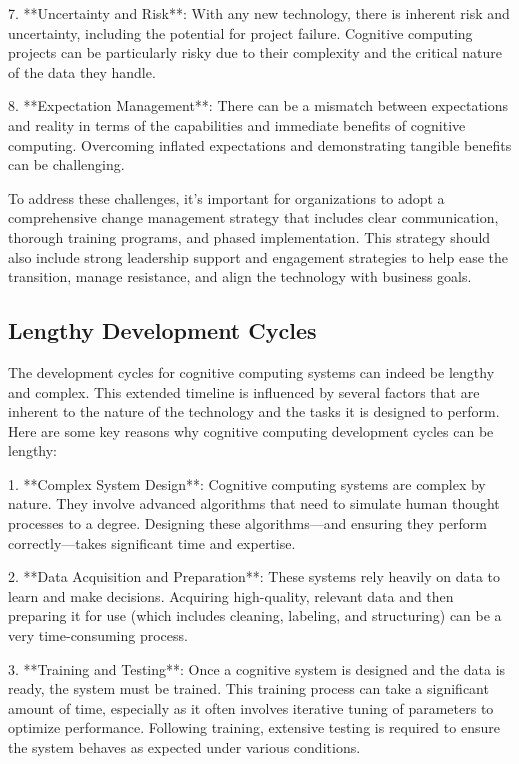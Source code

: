 \documentclass{article}
\begin{document}
\begin{enumerate}
7. **Uncertainty and Risk**: With any new technology, there is inherent risk and uncertainty, including the potential for project failure. Cognitive computing projects can be particularly risky due to their complexity and the critical nature of the data they handle.

8. **Expectation Management**: There can be a mismatch between expectations and reality in terms of the capabilities and immediate benefits of cognitive computing. Overcoming inflated expectations and demonstrating tangible benefits can be challenging.

To address these challenges, it's important for organizations to adopt a comprehensive change management strategy that includes clear communication, thorough training programs, and phased implementation. This strategy should also include strong leadership support and engagement strategies to help ease the transition, manage resistance, and align the technology with business goals.

\subsection{Lengthy Development Cycles}
The development cycles for cognitive computing systems can indeed be lengthy and complex. This extended timeline is influenced by several factors that are inherent to the nature of the technology and the tasks it is designed to perform. Here are some key reasons why cognitive computing development cycles can be lengthy:

1. **Complex System Design**: Cognitive computing systems are complex by nature. They involve advanced algorithms that need to simulate human thought processes to a degree. Designing these algorithms—and ensuring they perform correctly—takes significant time and expertise.

		2. **Data Acquisition and Preparation**: These systems rely heavily on data to learn and make decisions. Acquiring high-quality, relevant data and then preparing it for use (which includes cleaning, labeling, and structuring) can be a very time-consuming process.

		3. **Training and Testing**: Once a cognitive system is designed and the data is ready, the system must be trained. This training process can take a significant amount of time, especially as it often involves iterative tuning of parameters to optimize performance. Following training, extensive testing is required to ensure the system behaves as expected under various conditions.


\end{enumerate}
\end{document}
